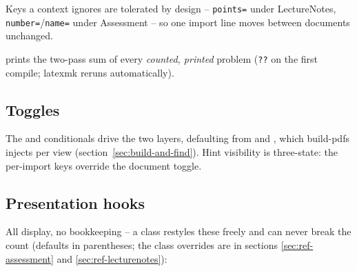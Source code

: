 Keys a context ignores are tolerated by design -- \texttt{points=} under
LectureNotes, \texttt{number=}/\texttt{name=} under Assessment -- so one
import line moves between documents unchanged.

 prints the two-pass sum of every \emph{counted,
printed} problem (\texttt{??} on the first compile; latexmk reruns
automatically).

\subsection*{Toggles}

The  and  conditionals drive the two layers,
defaulting from  and , which build-pdfs
injects per view (section~\ref{sec:build-and-find}). Hint visibility is
three-state: the per-import keys override the document toggle.

\subsection*{Presentation hooks}

All display, no bookkeeping -- a class restyles these freely and can never
break the count (defaults in parentheses; the class overrides are in
sections \ref{sec:ref-assessment} and \ref{sec:ref-lecturenotes}):

